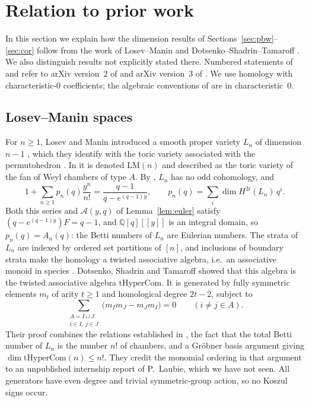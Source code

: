 \documentclass[11pt]{amsart}
\theoremstyle{definition}
\theoremstyle{remark}
\newcommand{\Q}{\mathbb{Q}}
\begin{document}
\section{Relation to prior work}\label{sec:prior}

In this section we explain how the dimension results of Sections~\ref{sec:pbw}--\ref{sec:cor} follow from the work of Losev--Manin \cite{LM} and Dotsenko--Shadrin--Tamaroff \cite{DST}. We also distinguish results not explicitly stated there. Numbered statements of \cite{LM} and \cite{DST} refer to arXiv version~2 of \cite{LM} and arXiv version~3 of \cite{DST}. We use homology with characteristic-$0$ coefficients; the algebraic conventions of \cite[\S2.1]{DST} are in characteristic~$0$.

\subsection*{Losev--Manin spaces}
For $n\ge1$, Losev and Manin introduced a smooth proper variety $L_n$ of dimension $n-1$ \cite[Thm.~2.2]{LM}, which they identify with the toric variety associated with the permutohedron \cite[\S2]{LM}. In \cite[Def.~2.4.1]{DST} it is denoted $\mathrm{LM}(n)$ and described as the toric variety of the fan of Weyl chambers of type $A$. By \cite[Thm.~2.3]{LM}, $L_n$ has no odd cohomology, and
\[
1+\sum_{n\ge1}p_n(q)\frac{y^n}{n!}=\frac{q-1}{q-e^{(q-1)y}},\qquad p_n(q)=\sum_i\dim H^{2i}(L_n)\,q^i.
\]
Both this series and $\mathcal A(y,q)$ of Lemma~\ref{lem:euler} satisfy $(q-e^{(q-1)y})F=q-1$, and $\Q[q][[y]]$ is an integral domain, so $p_n(q)=A_n(q)$: the Betti numbers of $L_n$ are Eulerian numbers. The strata of $L_n$ are indexed by ordered set partitions of $[n]$, and inclusions of boundary strata make the homology a twisted associative algebra, i.e.\ an associative monoid in species \cite[\S2.4]{DST}. Dotsenko, Shadrin and Tamaroff showed \cite[Prop.~2.4.2]{DST} that this algebra is the twisted associative algebra $\mathrm{tHyperCom}$. It is generated by fully symmetric elements $m_t$ of arity $t\ge1$ and homological degree $2t-2$, subject to
\[
\sum_{\substack{A=I\sqcup J\\ i\in I,\ j\in J}}\big(m_Im_J-m_Jm_I\big)=0\qquad(i\ne j\in A).
\]
Their proof combines the relations established in \cite{LM}, the fact that the total Betti number of $L_n$ is the number $n!$ of chambers, and a Gr\"obner basis argument giving $\dim\mathrm{tHyperCom}(n)\le n!$. They credit the monomial ordering in that argument to an unpublished internship report of P.~Laubie, which we have not seen. All generators have even degree and trivial symmetric-group action, so no Koszul signs occur.
\end{document}
